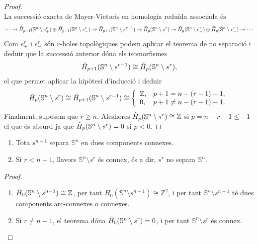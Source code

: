 \documentclass[../main.tex]{subfiles}
\begin{document}
\begin{proof}
\begin{equation}
\end{equation}
La successió exacta de Mayer-Vietoris en homologia reduïda associada és
\begin{equation}
    \notag
    \cdots \rightarrow \Tilde{H}_{p+1}(\mathbb{S}^n\setminus e_+^r)\oplus\Tilde{H}_{p+1}(\mathbb{S}^n\setminus e_-^r)\rightarrow \Tilde{H}_{p+1}(\mathbb{S}^n\setminus s^{r-1})\rightarrow \Tilde{H}_p(\mathbb{S}^n\setminus s^r)\rightarrow \Tilde{H}_p(\mathbb{S}^n\setminus e_+^r)\oplus\Tilde{H}_p(\mathbb{S}^n\setminus e_-^r)\rightarrow\cdots
\end{equation}
Com $e_+^r$ i $e_-^r$ són $r$-boles topològiques podem aplicar el teorema de no separació i deduir que la successió anterior dóna els isomorfismes
\begin{equation}
    \notag
    \Tilde{H}_{p+1}(\mathbb{S}^n\setminus s^{r-1})\cong\Tilde{H}_p(\mathbb{S}^n\setminus s^r),
\end{equation}
el que permet aplicar la hipòtesi d'inducció i deduir
\begin{equation}
    \notag
    \Tilde{H}_p(\mathbb{S}^n\setminus s^r)\cong\Tilde{H}_{p+1}(\mathbb{S}^n\setminus s^{r-1})\cong\left\{
    \begin{array}{ll}
        \mathbb{Z}, & p+1=n-(r-1)-1, \\
        0, & p+1\not=n-(r-1)-1.
    \end{array}
    \right.
\end{equation}
Finalment, suposem que $r\geq n$. Aleshores $\Tilde{H}_p(\mathbb{S}^n\setminus s^r)\cong\mathbb{Z}$ si $p = n-r-1\leq -1$ el que és absurd ja que $\Tilde{H}_p(\mathbb{S}^n\setminus s^r) = 0$ si $p<0$.
\end{proof}

\begin{coro}
\label{coro:jordanbrouwer} \begin{enumerate}
    \item Tota $s^{n-1}$ separa $\mathbb{S}^n$ en dues components connexes.
    \item Si $r<n-1$, llavors $\mathbb{S}^n\setminus s^r$ és connex, és a dir, $s^r$ no separa $\mathbb{S}^n$.
\end{enumerate}
\end{coro}
\begin{proof}
\begin{enumerate}
    \item $\Tilde{H}_0(\mathbb{S}^n\setminus s^{n-1})\cong\mathbb{Z}$, per tant $H_0(\mathbb{S}^n\setminus s^{n-1})\cong\mathbb{Z}^2$, i per tant $\mathbb{S}^n\setminus s^{n-1}$ té dues components arc-connexes o connexes.
    \item Si $r\not=n-1$, el teorema dóna $\Tilde{H}_0(\mathbb{S}^n\setminus s^r) = 0$, i per tant $\mathbb{S}^n\setminus s^r$ és connex.
\end{enumerate}
\end{proof}
\end{document}
